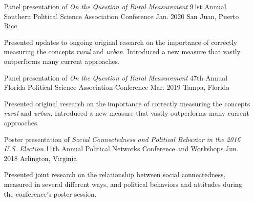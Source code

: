 

\begin{cventries}

\cventry
  {Panel presentation of \emph{On the Question of Rural Measurement}} %
  {91st Annual Southern Political Science Association Conference} %
  {Jan. 2020} %
  {San Juan, Puerto Rico} %
  {
    \begin{cvitems} %
      \item {Presented updates to ongoing original research on the importance of correctly measuring the concepts \emph{rural} and \emph{urban}. Introduced a new measure that vastly outperforms many current approaches.}
    \end{cvitems}
  }

\cventry
  {Panel presentation of \emph{On the Question of Rural Measurement}} %
  {47th Annual Florida Political Science Association Conference} %
  {Mar. 2019} %
  {Tampa, Florida} %
  {
    \begin{cvitems} %
      \item {Presented original research on the importance of correctly measuring the concepts \emph{rural} and \emph{urban}. Introduced a new measure that vastly outperforms many current approaches.}
    \end{cvitems}
  }

\cventry
  {Poster presentation of \emph{Social Connectedness and Political Behavior in the 2016 U.S. Election}} %
  {11th Annual Political Networks Conference and Workshops} %
  {Jun. 2018} %
  {Arlington, Virginia} %
  {
    \begin{cvitems} %
      \item {Presented joint research on the relationship between social connectedness, measured in several different ways, and political behaviors and attitudes during the conference's poster session.}
    \end{cvitems}
  }


\end{cventries}
